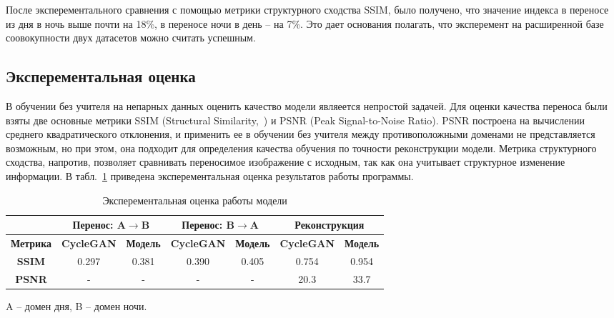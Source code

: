 \documentclass[11pt,a4paper]{extarticle}
\begin{document}
{			\noindent
			После эксперементального сравнения с помощью метрики структурного сходства SSIM, было получено, что значение индекса в переносе из дня в ночь выше почти на 18\%, в переносе ночи в день -- на 7\%.
			Это дает основания полагать, что эксперемент на расширенной базе соовокупности двух датасетов можно считать успешным.


	\subsection{Эксперементальная оценка}\label{sec:eval}

		В обучении без учителя на непарных данных оценить качество модели являеется непростой задачей.
		Для оценки качества переноса были взяты две основные метрики SSIM (Structural Similarity,~\cite{metric:ssim}) и PSNR (Peak Signal-to-Noise Ratio).
		PSNR построена на вычислении среднего квадратического отклонения, и применить ее в обучении без учителя между противоположными доменами не представляется возможным, но при этом, она подходит для определения качества обучения по точности реконструкции модели.
		Метрика структурного сходства, напротив, позволяет сравнивать переносимое изображение с исходным, так как она учитывает структурное изменение информации.
		В табл.~\ref{tab:metrics} приведена эксперементальная оценка результатов работы программы.

		\begin{table}[ht]
			\centering
			\begin{tabular}{|c|c|c|c|c|c|c|}
				\hline
				\rowcolor[HTML]{EFEFEF} 
														& \multicolumn{2}{c|}{\cellcolor[HTML]{EFEFEF}\textbf{Перенос: A$\rightarrow$B}} & \multicolumn{2}{c|}{\cellcolor[HTML]{EFEFEF}\textbf{Перенос: B$\rightarrow$A}} & \multicolumn{2}{c|}{\cellcolor[HTML]{EFEFEF}\textbf{Реконструкция}} \\ \hline
				\rowcolor[HTML]{EFEFEF} 
				{\color[HTML]{9A0000} \textbf{Метрика}} & \textbf{CycleGAN}                       & \textbf{Модель}                      & \textbf{CycleGAN}                       & \textbf{Модель}                      & \textbf{CycleGAN}                 & \textbf{Модель}                 \\ \hline
				\cellcolor[HTML]{EFEFEF}\textbf{SSIM}   & 0.297                                   & 0.381                                & 0.390                                   & 0.405                                & 0.754                             & 0.954                           \\ \hline
				\cellcolor[HTML]{EFEFEF}\textbf{PSNR}   & -                                       & -                                    & -                                       & -                                    & 20.3                              & 33.7                            \\ \hline
				\end{tabular}
			\caption{Эксперементальная оценка работы модели}{
				\small{
					A -- домен дня, B -- домен ночи.
				}
			}
			\label{tab:metrics}
		\end{table}
		
}
\end{document}
